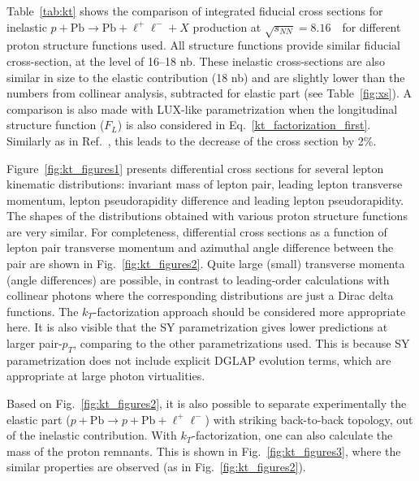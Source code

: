 Table~\ref{tab:kt} shows the comparison of integrated fiducial cross sections for inelastic $p+\textrm{Pb}\rightarrow \textrm{Pb} + \ell^+\ell^- + X$ production at $\sqrt{s_{N N}} = 8.16$~\TeV\ for different proton structure functions used.
All structure functions provide similar fiducial cross-section, at the level of 16--18 nb.
These inelastic cross-sections are also similar in size to the elastic contribution (18 nb) and are slightly lower than the numbers from collinear analysis, subtracted for elastic part (see Table~\ref{fig:xs}).
A comparison is also made with LUX-like parametrization when the longitudinal structure function ($F_L$) is also considered in Eq.~\ref{kt_factorization_first}. Similarly as in Ref.~\cite{Luszczak:2018ntp}, this leads to the decrease of the cross section by 2\%.

Figure~\ref{fig:kt_figures1} presents differential cross sections for several lepton kinematic distributions: invariant mass of lepton pair, leading lepton transverse momentum, lepton pseudorapidity difference and leading lepton pseudorapidity.
The shapes of the distributions obtained with various proton structure functions are very similar.
For completeness, differential cross sections as a function of lepton pair transverse momentum and azimuthal angle difference between the pair  are shown in Fig.~\ref{fig:kt_figures2}. Quite large (small) transverse momenta (angle differences) are possible, in contrast to leading-order calculations with collinear photons where the corresponding distributions are just a Dirac delta functions. 
The $k_T$-factorization approach should be considered more appropriate here. It is also visible that the SY parametrization gives lower predictions at larger pair-$p_T$, comparing to the other parametrizations used. This is because SY parametrization does not include explicit DGLAP evolution terms, which are appropriate at large photon virtualities.

Based on Fig.~\ref{fig:kt_figures2}, it is also possible to separate experimentally the elastic part ($p+\textrm{Pb}\rightarrow p+ \textrm{Pb} + \ell^+\ell^-$) with striking back-to-back topology, out of the inelastic contribution.
With $k_T$-factorization, one can also calculate the mass of the proton remnants. This is shown in Fig.~\ref{fig:kt_figures3}, where the similar properties are observed (as in Fig.~\ref{fig:kt_figures2}).



